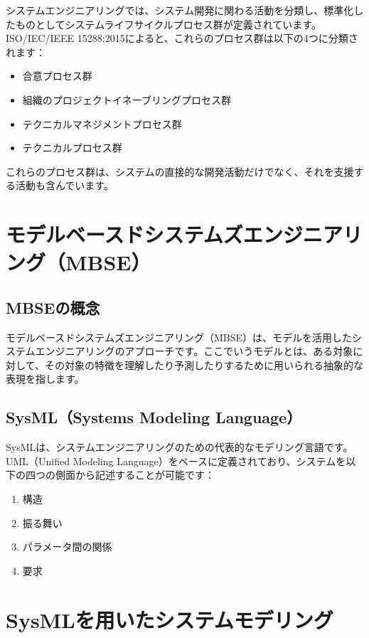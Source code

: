 システムエンジニアリングでは、システム開発に関わる活動を分類し、標準化したものとしてシステムライフサイクルプロセス群が定義されています。ISO/IEC/IEEE 15288:2015によると、これらのプロセス群は以下の4つに分類されます：

\begin{itemize}
    \item 合意プロセス群
    \item 組織のプロジェクトイネーブリングプロセス群
    \item テクニカルマネジメントプロセス群
    \item テクニカルプロセス群
\end{itemize}

これらのプロセス群は、システムの直接的な開発活動だけでなく、それを支援する活動も含んでいます。

\section{モデルベースドシステムズエンジニアリング（MBSE）}

\subsection{MBSEの概念}

モデルベースドシステムズエンジニアリング（MBSE）は、モデルを活用したシステムエンジニアリングのアプローチです。ここでいうモデルとは、ある対象に対して、その対象の特徴を理解したり予測したりするために用いられる抽象的な表現を指します。

\subsection{SysML（Systems Modeling Language）}

SysMLは、システムエンジニアリングのための代表的なモデリング言語です。UML（Unified Modeling Language）をベースに定義されており、システムを以下の四つの側面から記述することが可能です：

\begin{enumerate}
    \item 構造
    \item 振る舞い
    \item パラメータ間の関係
    \item 要求
\end{enumerate}

\section{SysMLを用いたシステムモデリング}


